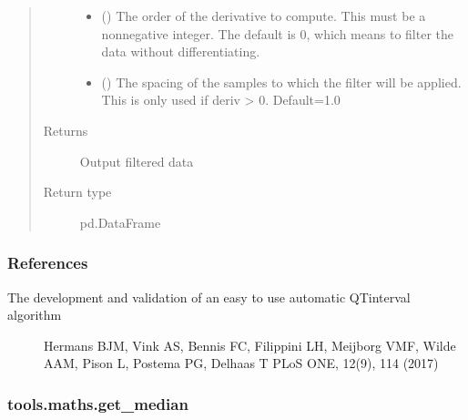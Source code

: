 \documentclass[letterpaper,10pt,english]{sphinxmanual}
\begin{document}
\begin{fulllineitems}
\begin{quote}
\begin{description}
\begin{itemize}
\item {} 
\sphinxAtStartPar
{} (\sphinxstyleliteralemphasis{\sphinxupquote{, }}) \textendash{} The order of the derivative to compute. This must be a nonnegative integer. The default is 0, which means to
filter the data without differentiating.

\item {} 
\sphinxAtStartPar
{} (\sphinxstyleliteralemphasis{\sphinxupquote{, }}) \textendash{} The spacing of the samples to which the filter will be applied. This is only used if deriv \textgreater{} 0. Default=1.0

\end{itemize}

\item[{Returns}] \leavevmode
\sphinxAtStartPar
{} \textendash{} Output filtered data

\item[{Return type}] \leavevmode
\sphinxAtStartPar
pd.DataFrame

\end{description}\end{quote}
\subsubsection*{References}
\begin{description}
\item[{The development and validation of an easy to use automatic QT\sphinxhyphen{}interval algorithm}] \leavevmode
\sphinxAtStartPar
Hermans BJM, Vink AS, Bennis FC, Filippini LH, Meijborg VMF, Wilde AAM, Pison L, Postema PG, Delhaas T
PLoS ONE, 12(9), 1\textendash{}14 (2017)

\end{description}

\end{fulllineitems}



\subsubsection{tools.maths.get\_median}
\label{\detokenize{_autosummary/tools.maths.get_median:tools-maths-get-median}}\label{\detokenize{_autosummary/tools.maths.get_median::doc}}
\end{document}
